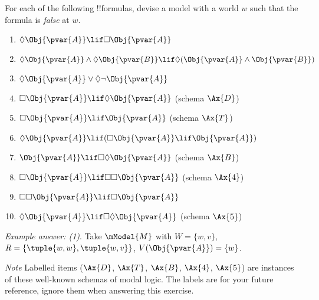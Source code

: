 \documentclass[../../../include/open-logic-section]{subfiles}
\begin{document}
    \begin{prob}
    For each of the following !!{formula}s, devise a model with a world $w$
    such that the formula is \emph{false} at $w$. 
    
    \begin{enumerate}
        \item $\Diamond \Obj{\pvar{A}}\lif\Box \Obj{\pvar{A}}$
        \item $\Diamond \Obj{\pvar{A}}\land\Diamond \Obj{\pvar{B}}\lif\Diamond(\Obj{\pvar{A}}\land \Obj{\pvar{B}})$
        \item $\Diamond \Obj{\pvar{A}}\lor\Diamond\lnot \Obj{\pvar{A}}$
        \item $\Box \Obj{\pvar{A}}\lif\Diamond \Obj{\pvar{A}}$ (schema $\Ax{D}$)
        \item $\Box \Obj{\pvar{A}}\lif \Obj{\pvar{A}}$ (schema $\Ax{T}$)
        \item $\Diamond \Obj{\pvar{A}}\lif(\Box \Obj{\pvar{A}}\lif \Obj{\pvar{A}})$
        \item $\Obj{\pvar{A}}\lif\Box\Diamond \Obj{\pvar{A}}$ (schema $\Ax{B}$)
        \item $\Box \Obj{\pvar{A}}\lif\Box\Box \Obj{\pvar{A}}$ (schema $\Ax{4}$)
        \item $\Box\Box \Obj{\pvar{A}}\lif\Box \Obj{\pvar{A}}$
        \item $\Diamond \Obj{\pvar{A}}\lif\Box\Diamond \Obj{\pvar{A}}$ (schema $\Ax{5}$)
    \end{enumerate}
    
    \emph{Example answer: (1)}. Take $\mModel{M}$ with $W=\{w,v\}$, 
    $R=\{\tuple{w,w},\tuple{w,v}\}$, $V(\Obj{\pvar{A}})=\{w\}$. 
    
    \emph{Note} Labelled items ($\Ax{D}$, $\Ax{T}$, 
    $\Ax{B}$, $\Ax{4}$, $\Ax{5}$) are instances of these 
    well-known schemas of modal logic. The labels are for
    your future reference, ignore them when answering this exercise.
    

\end{prob}
\end{document}
